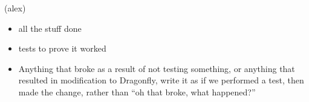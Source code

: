 \color{red}
(alex)
\begin{itemize}
\item all the stuff done
\item tests to prove it worked  
\item Anything that broke as a result of not testing something, or anything that resulted in modification to Dragonfly, write it as if we performed a test, then made the change, rather than ``oh that broke, what happened?''
\end{itemize}
\color{black}